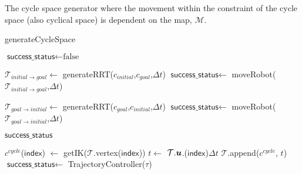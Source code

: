 \begin{table}
  \captionsetup{justification=centering}
  \caption{The cycle space generator where the movement within the constraint of
  the cycle space (also cyclical space) is dependent on the map, $\mathcal{M}$.}
  \label{tab:cycle_space_table}
  \begin{algorithm}[H]
  \caption{generateCycleSpace}
  \label{algo:cycle_space} 
  \DontPrintSemicolon
  
    { 
    $ \textsf{success\_status} \gets \text{false}$\;\label{ln:cs1}
     {
       $\mathcal{T}_{initial\rightarrow goal} \gets$ generateRRT($c_{initial}$,$c_{goal}$,$\Delta t $)\;\label{ln:cs_RRT1}
       $\textsf{success\_status} \gets$ 
            moveRobot($\mathcal{T}_{initial\rightarrow goal}$,$\Delta t$)\;\label{ln:cs_move_robot1}
      
      { 
          $\mathcal{T}_{goal\rightarrow initial} \gets$ generateRRT($c_{goal}$,$c_{initial}$,$\Delta t $)\;\label{ln:cs_RRT2}
          $\textsf{success\_status} \gets$ 
            moveRobot($\mathcal{T}_{goal \rightarrow initial}$,$\Delta t$)\;\label{ln:cs_move_robot2}
      }
     }
    \KwRet $\textsf{success\_status}$\;
    }

    {
      {
        $c^{cycle}$($\textsf{index}$) $\gets$ getIK($\mathcal{T}$.vertex($\textsf{index}$))\;
        $t \gets$ $\mathcal{T}.\vb*{u}$.($\textsf{index}$)$\Delta t$\;
        $\mathcal{T}$.append($c^{cycle}$, $t$)
      }
      $\textsf{success\_status} \gets$ TrajectoryController($\tau$)\;

    }
\end{algorithm}
\end{table}
